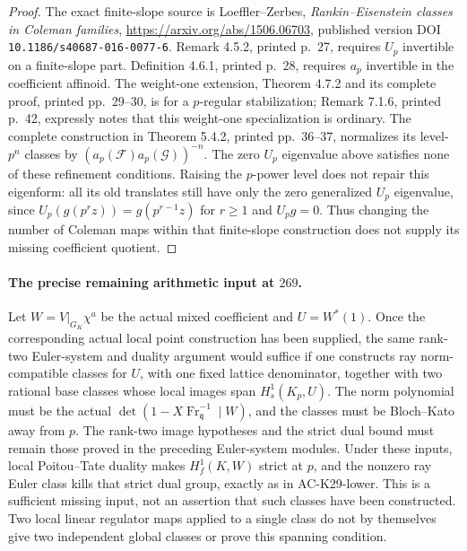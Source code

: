 \begin{proof}
The exact finite-slope source is Loeffler--Zerbes,
\emph{Rankin--Eisenstein classes in Coleman families},
\url{https://arxiv.org/abs/1506.06703}, published version
DOI \texttt{10.1186/s40687-016-0077-6}.
Remark 4.5.2, printed p.~27, requires $U_p$ invertible on
a finite-slope part.  Definition 4.6.1, printed p.~28,
requires $a_p$ invertible in the coefficient affinoid.
The weight-one extension, Theorem 4.7.2 and its complete
proof, printed pp.~29--30, is for a $p$-regular
stabilization; Remark 7.1.6, printed p.~42, expressly
notes that this weight-one specialization is ordinary.
The complete construction in Theorem 5.4.2, printed
pp.~36--37, normalizes its level-$p^n$ classes by
$(a_p(\mathcal F)a_p(\mathcal G))^{-n}$.
The zero $U_p$ eigenvalue above satisfies none of these
refinement conditions.  Raising the $p$-power level does
not repair this eigenform: all its old translates still
have only the zero generalized $U_p$ eigenvalue, since
$U_p(g(p^r z))=g(p^{r-1}z)$ for $r\ge1$ and $U_pg=0$.
Thus changing the number of Coleman maps within that
finite-slope construction does not supply its missing
coefficient quotient.
\end{proof}

\paragraph{The precise remaining arithmetic input at $269$.}
Let $W=V|_{G_K}\chi^a$ be the actual mixed coefficient and
$U=W^*(1)$.  Once the corresponding actual local point
construction has been supplied, the same rank-two
Euler-system and duality argument would suffice if one
constructs ray norm-compatible classes for $U$, with one
fixed lattice denominator, together with two rational
base classes whose local images span
$H_s^1(K_p,U)$.  The norm polynomial must be the actual
$\det(1-X\operatorname{Fr}_{\mathfrak q}^{-1}\mid W)$,
and the classes must be Bloch--Kato away from $p$.
The rank-two image hypotheses and the strict dual bound
must remain those proved in the preceding Euler-system
modules.  Under these inputs, local Poitou--Tate duality
makes $H_f^1(K,W)$ strict at $p$, and the nonzero ray
Euler class kills that strict dual group, exactly as in
AC-K29-lower.  This is a sufficient missing input, not
an assertion that such classes have been constructed.
Two local linear regulator maps applied to a single
class do not by themselves give two independent global
classes or prove this spanning condition.

